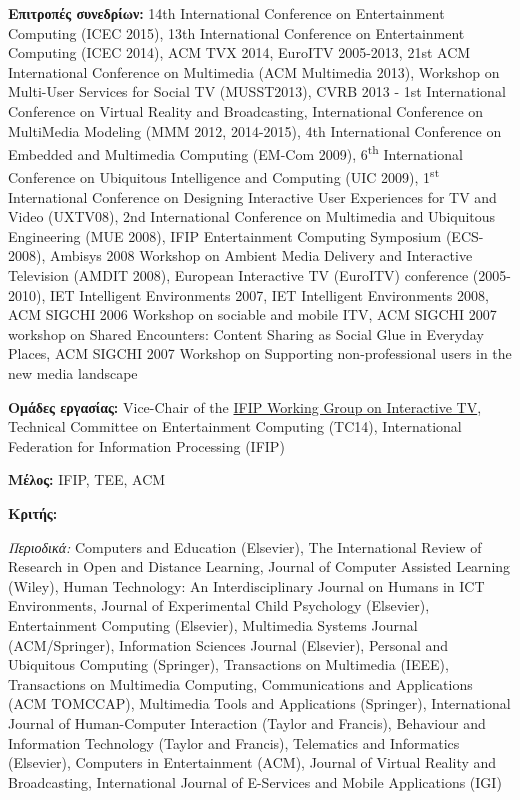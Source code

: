 \documentclass[11pt, a4paper]{article}
\begin{document}
\begin{greek}
\textbf{Επιτροπές συνεδρίων:} 14th International Conference on
Entertainment Computing (ICEC 2015), 13th International Conference on
Entertainment Computing (ICEC 2014), ACM TVX 2014, EuroITV 2005-2013,
21st ACM International Conference on Multimedia (ACM Multimedia 2013),
Workshop on Multi-User Services for Social TV (MUSST2013), CVRB 2013 -
1st International Conference on Virtual Reality and Broadcasting,
International Conference on MultiMedia Modeling (MMM 2012, 2014-2015),
4th International Conference on Embedded and Multimedia Computing
(EM-Com 2009), 6\textsuperscript{th} International Conference on
Ubiquitous Intelligence and Computing (UIC 2009), 1\textsuperscript{st}
International Conference on Designing Interactive User Experiences for
TV and Video (UXTV08), 2nd International Conference on Multimedia and
Ubiquitous Engineering (MUE 2008), IFIP Entertainment Computing
Symposium (ECS-2008), Ambisys 2008 Workshop on Ambient Media Delivery
and Interactive Television (AMDIT 2008), European Interactive TV
(EuroITV) conference (2005-2010), IET Intelligent Environments 2007, IET
Intelligent Environments 2008, ACM SIGCHI 2006 Workshop on sociable and
mobile ITV, ACM SIGCHI 2007 workshop on Shared Encounters: Content
Sharing as Social Glue in Everyday Places, ACM SIGCHI 2007 Workshop on
Supporting non-professional users in the new media landscape

\textbf{Ομάδες εργασίας:} Vice-Chair of the
\href{http://www.ifip.org/bulletin/bulltcs/memtc14.htm\#WG146}{IFIP
Working Group on Interactive TV}, Technical Committee on Entertainment
Computing (TC14), International Federation for Information Processing
(IFIP)

\textbf{Μέλος:} IFIP, TEE, ACM

\textbf{Κριτής:}

\emph{Περιοδικά:} Computers and Education (Elsevier), The International
Review of Research in Open and Distance Learning, Journal of Computer
Assisted Learning (Wiley), Human Technology: An Interdisciplinary
Journal on Humans in ICT Environments, Journal of Experimental Child
Psychology (Elsevier), Entertainment Computing (Elsevier), Multimedia
Systems Journal (ACM/Springer), Information Sciences Journal (Elsevier),
Personal and Ubiquitous Computing (Springer), Transactions on Multimedia
(IEEE), Transactions on Multimedia Computing, Communications and
Applications (ACM TOMCCAP), Multimedia Tools and Applications
(Springer), International Journal of Human-Computer Interaction (Taylor
and Francis), Behaviour and Information Technology (Taylor and Francis),
Telematics and Informatics (Elsevier), Computers in Entertainment (ACM),
Journal of Virtual Reality and Broadcasting, International Journal of
E-Services and Mobile Applications (IGI)


\end{greek}
\end{document}

